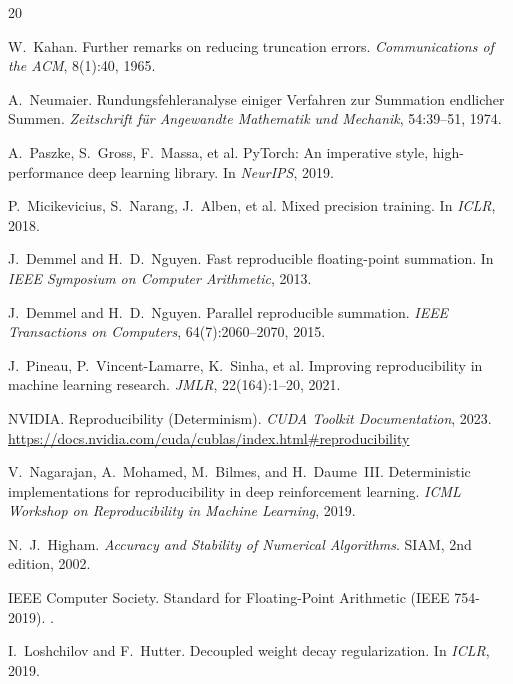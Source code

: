 \documentclass[11pt,a4paper]{article}
\begin{document}
\begin{thebibliography}{20}

W.~Kahan.
\newblock Further remarks on reducing truncation errors.
\newblock \emph{Communications of the ACM}, 8(1):40, 1965.

A.~Neumaier.
\newblock Rundungsfehleranalyse einiger Verfahren zur Summation endlicher Summen.
\newblock \emph{Zeitschrift f\"ur Angewandte Mathematik und Mechanik}, 54:39--51, 1974.

A.~Paszke, S.~Gross, F.~Massa, et al.
\newblock PyTorch: An imperative style, high-performance deep learning library.
\newblock In \emph{NeurIPS}, 2019.

P.~Micikevicius, S.~Narang, J.~Alben, et al.
\newblock Mixed precision training.
\newblock In \emph{ICLR}, 2018.

J.~Demmel and H.~D.~Nguyen.
\newblock Fast reproducible floating-point summation.
\newblock In \emph{IEEE Symposium on Computer Arithmetic}, 2013.

J.~Demmel and H.~D.~Nguyen.
\newblock Parallel reproducible summation.
\newblock \emph{IEEE Transactions on Computers}, 64(7):2060--2070, 2015.

J.~Pineau, P.~Vincent-Lamarre, K.~Sinha, et al.
\newblock Improving reproducibility in machine learning research.
\newblock \emph{JMLR}, 22(164):1--20, 2021.

NVIDIA.
\newblock Reproducibility (Determinism).
\newblock \emph{CUDA Toolkit Documentation}, 2023.
\newblock \url{https://docs.nvidia.com/cuda/cublas/index.html#reproducibility}

V.~Nagarajan, A.~Mohamed, M.~Bilmes, and H.~Daume~III.
\newblock Deterministic implementations for reproducibility in deep reinforcement learning.
\newblock \emph{ICML Workshop on Reproducibility in Machine Learning}, 2019.

N.~J.~Higham.
\newblock \emph{Accuracy and Stability of Numerical Algorithms}.
\newblock SIAM, 2nd edition, 2002.

IEEE Computer Society.
 Standard for Floating-Point Arithmetic ({IEEE} 754-2019).
.

I.~Loshchilov and F.~Hutter.
\newblock Decoupled weight decay regularization.
\newblock In \emph{ICLR}, 2019.

\end{thebibliography}
\end{document}
